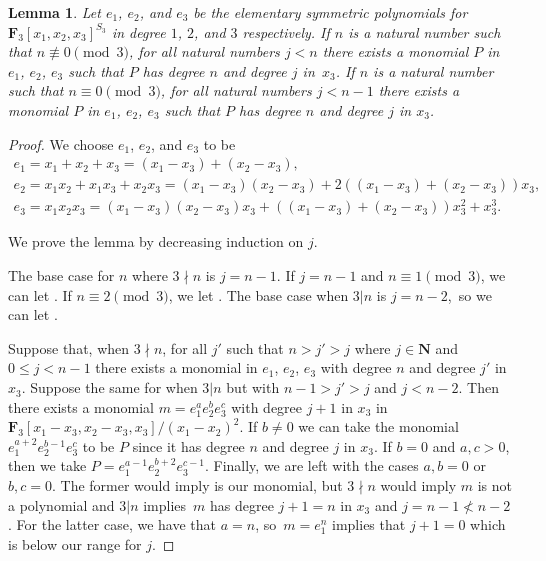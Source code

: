 \documentclass[pdftex]{sigma}
\newtheorem{Lemma}[Theorem]{Lemma}
\theoremstyle{definition}
\numberwithin{equation}{section}
\begin{document}
\begin{Lemma}\label{monAll}
 Let $e_1$, $e_2$, and $e_3$ be the elementary symmetric polynomials for $\mathbf{F}_3[x_1,x_2,x_3]^{S_3}$ in degree $1$, $2$, and $3$ respectively. If $n$ is a natural number such that $n\not\equiv 0\pmod{3}$, for all natural numbers $j<n$ there exists a monomial $P$ in $e_1$, $e_2$, $e_3$ such that $P$ has degree $n$ and degree $j$ in~$x_3$. If $n$ is a natural number such that $n\equiv 0 \pmod{3}$, for all natural numbers $j<n-1$ there exists a monomial $P$ in $e_1$, $e_2$, $e_3$ such that $P$ has degree $n$ and degree $j$ in $x_3$.
\end{Lemma}
\begin{proof}
 We choose $e_1$, $e_2$, and $e_3$ to be
 \begin{gather*}
 e_1=x_1+x_2+x_3=(x_1-x_3)+(x_2-x_3),\\
 e_2=x_1x_2+x_1x_3+x_2x_3=(x_1-x_3)(x_2-x_3)+2((x_1-x_3)+(x_2-x_3))x_3,\\
 e_3=x_1x_2x_3=(x_1-x_3)(x_2-x_3)x_3+((x_1-x_3)+(x_2-x_3))x_3^2 + x_3^3.
 \end{gather*}

 We prove the lemma by decreasing induction on $j$.

 The base case for $n$ where $3\nmid n$ is $j=n-1$. If $j=n-1$ and $n\equiv 1 \pmod{3}$, we can let . If $n\equiv 2 \pmod{3}$, we let . The base case when $3|n$ is $j=n-2$,~so we can let .

 Suppose that, when $3\nmid n$, for all $j'$ such that $n>j'>j$ where $j\in \mathbf{N}$ and $0\leq j<n-1$ there exists a monomial in $e_1$, $e_2$, $e_3$ with degree $n$ and degree $j'$ in $x_3$. Suppose the same for when $3|n$ but with $n-1>j'>j$ and $j<n-2$. Then there exists a monomial $m=e_1^ae_2^be_3^c$ with degree $j+1$ in $x_3$ in $\mathbf{F}_3[x_1-x_3,x_2-x_3,x_3]/(x_1-x_2)^2$. If $b\neq 0$ we can take the monomial $e_1^{a+2}e_2^{b-1}e_3^{c}$ to be $P$ since it has degree $n$ and degree $j$ in $x_3$. If $b=0$ and $a,c>0$, then we take $P=e_1^{a-1}e_2^{b+2}e_3^{c-1}$. Finally, we are left with the cases $a,b=0$ or $b,c=0$. The former would imply  is our monomial, but $3\nmid n$ would imply $m$ is not a polynomial and $3|n$ implies~$m$ has degree $j+1=n$ in $x_3$ and $j=n-1\not < n-2$. For the latter case, we have that $a=n$, so~${m=e_1^{n}}$ implies that $j+1=0$ which is below our range for $j$.
\end{proof}
\end{document}
